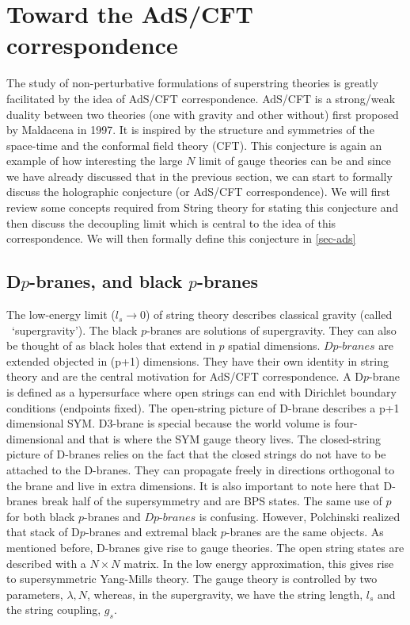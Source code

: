 \section{Toward the AdS/CFT correspondence} 
The study of non-perturbative formulations of superstring theories is 
greatly facilitated by the idea of AdS/CFT correspondence. AdS/CFT is 
a strong/weak duality between two theories (one with gravity and other without) 
first proposed by Maldacena in 1997. It is inspired by the structure and symmetries of the 
space-time and the conformal field theory (CFT). 
This conjecture is again an example of how interesting the large 
$N$ limit of gauge theories can be and since we have already discussed 
that in the previous section, we can start to formally discuss 
the holographic conjecture (or AdS/CFT correspondence). 
We will first review some concepts required from String theory for stating this conjecture 
and then discuss the decoupling limit which is central to the idea of this 
correspondence. We will then formally define this conjecture in \ref{sec-ads} 

\subsection{D$p$-branes, and black $p$-branes} 

The low-energy limit ($l_{s} \to 0$) of string theory describes classical gravity (called ~`supergravity'). 
The black $p$-branes are solutions of supergravity. They can also be thought of as black holes that 
extend in $p$ spatial dimensions. 
$\textit{Dp-branes}$ are extended objected in (p+1) dimensions. 
They have their own identity in string theory and are the central motivation for AdS/CFT correspondence. 
A D$p$-brane is defined as a hypersurface where open strings can end with 
Dirichlet boundary conditions (endpoints fixed). 
The open-string picture of D-brane describes a p+1 dimensional SYM. 
D3-brane is special because the world volume is four-dimensional 
and that is where the SYM gauge theory lives. The closed-string picture of 
D-branes relies on the fact that the closed strings do not have to 
be attached to the D-branes. They can propagate freely in directions orthogonal to the brane and live in extra dimensions. 
It is also important to note here that D-branes break half of the supersymmetry and are BPS states. 
The same use of $p$ for both black $p$-branes and $\textit{D$p$-branes}$ is 
confusing. However, Polchinski \cite{Polchinski:1995mt} realized that stack of D$p$-branes 
and extremal black $p$-branes are the same objects.
As mentioned before, D-branes give rise to gauge theories. The open 
string states are described with a $N \times N$ matrix. 
In the low energy approximation, this gives rise to supersymmetric 
Yang-Mills theory. The gauge theory is controlled by two parameters, 
$\lambda, N$, whereas, in the supergravity, we have the string length, $l_{s}$ and the string coupling, $g_{s}$. 

